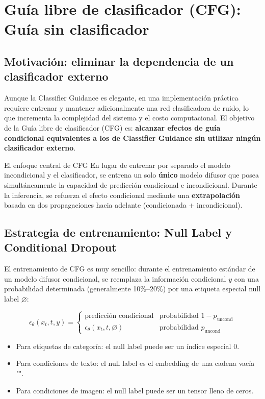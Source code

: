 \section{Guía libre de clasificador (CFG): Guía sin clasificador}

\subsection{Motivación: eliminar la dependencia de un clasificador externo}

Aunque la Classifier Guidance es elegante, en una implementación práctica requiere entrenar y mantener adicionalmente una red clasificadora de ruido, lo que incrementa la complejidad del sistema y el costo computacional. El objetivo de la Guía libre de clasificador (CFG) es: \textbf{alcanzar efectos de guía condicional equivalentes a los de Classifier Guidance sin utilizar ningún clasificador externo}.

\begin{importantbox}{El enfoque central de CFG}
En lugar de entrenar por separado el modelo incondicional y el clasificador, se entrena un solo \textbf{único} modelo difusor que posea simultáneamente la capacidad de predicción condicional e incondicional. Durante la inferencia, se refuerza el efecto condicional mediante una \textbf{extrapolación} basada en dos propagaciones hacia adelante (condicionada + incondicional).
\end{importantbox}

\subsection{Estrategia de entrenamiento: Null Label y Conditional Dropout}

El entrenamiento de CFG es muy sencillo: durante el entrenamiento estándar de un modelo difusor condicional, se reemplaza la información condicional $y$ con una probabilidad determinada (generalmente 10\%--20\%) por una etiqueta especial null label $\varnothing$:

$$
\epsilon_\theta(x_t, t, y) = \begin{cases}
\text{predicción condicional} & \text{probabilidad } 1-p_{\text{uncond}} \\
\epsilon_\theta(x_t, t, \varnothing) & \text{probabilidad } p_{\text{uncond}}
\end{cases}
$$

\begin{itemize}
    \item Para etiquetas de categoría: el null label puede ser un índice especial 0.
    \item Para condiciones de texto: el null label es el embedding de una cadena vacía "".
    \item Para condiciones de imagen: el null label puede ser un tensor lleno de ceros.
\end{itemize}

